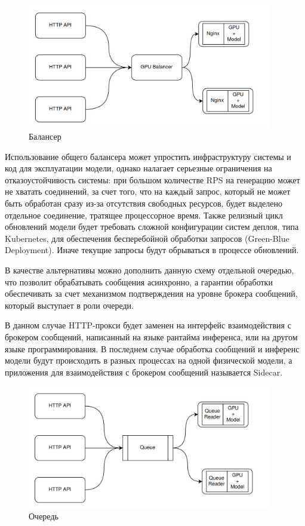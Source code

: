 \begin{figure}[H]
  \centering
  \includegraphics[width=0.95\textwidth]{img/gpu_balancer.png}
  \caption{Балансер}
    \label{fig:balancer}
\end{figure}

Использование общего балансера может упростить инфраструктуру системы и код для эксплуатации модели, однако налагает
серьезные ограничения на отказоустойчивость системы: при большом количестве RPS на генерацию может не хватать 
соединений, за счет того, что на каждый запрос, который не может быть обработан сразу из-за отсутствия свободных ресурсов,
будет выделено отдельное соединение, тратящее процессорное время. Также релизный цикл обновлений модели
будет требовать сложной конфигурации систем деплоя, типа Kubernetes, для обеспечения бесперебойной обработки запросов (Green-Blue Deployment).
Иначе текущие запросы будут обрываться в процессе обновлений.

В качестве альтернативы можно дополнить данную схему отдельной очередью, что позволит обрабатывать сообщения асинхронно, а 
гарантии обработки обеспечивать за счет механизмом подтверждения на уровне брокера сообщений, который выступает в роли очереди.

В данном случае HTTP-прокси будет заменен на интерфейс взаимодействия с брокером сообщений, написанный на языке 
рантайма инференса, или на другом языке программирования. В последнем случае обработка сообщений и инференс модели
будут происходить в разных процессах на одной физической модели, а приложения для взаимодействия с брокером сообщений называется 
Sidecar.

\begin{figure}[H]
  \centering
  \includegraphics[width=0.95\textwidth]{img/queue.png}
  \caption{Очередь}
    \label{fig:queue}
\end{figure}

